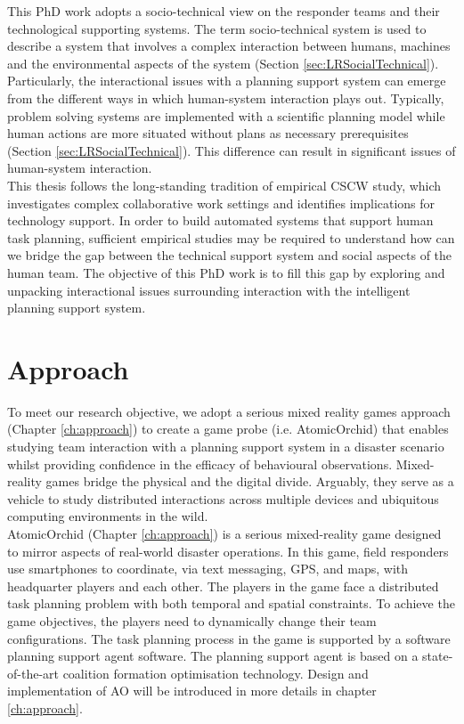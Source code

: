 This PhD work adopts a socio-technical view on the responder teams and their technological supporting systems. The term socio-technical system is used to describe a system that involves a complex interaction between humans, machines and the environmental aspects of the system (Section \ref{sec:LRSocialTechnical}). Particularly, the interactional issues with a planning support system can emerge from the different ways in which human-system interaction plays out. Typically, problem solving systems are implemented with a scientific planning model while human actions are more situated without plans as necessary prerequisites (Section \ref{sec:LRSocialTechnical}). This difference can result in significant issues of human-system interaction.\\

This thesis follows the long-standing tradition of empirical \ac{CSCW} study, which investigates complex collaborative work settings and identifies implications for technology support. In order to build automated systems that support human task planning, sufficient empirical studies may be required to understand how can we bridge the gap between the technical support system and social aspects of the human team.  The objective of this PhD work is to fill this gap by exploring and unpacking interactional issues surrounding interaction with the intelligent planning support system.\\

\section{Approach}\label{sec:custom}


To meet our research objective, we adopt a serious mixed reality games approach (Chapter \ref{ch:approach}) to create a game probe (i.e. AtomicOrchid) that enables studying team interaction with a planning support system in a disaster scenario whilst providing confidence in the efficacy of behavioural observations. Mixed-reality games bridge the physical and the digital divide. Arguably, they serve as a vehicle to study distributed interactions across multiple devices and ubiquitous computing environments in the wild.\\

AtomicOrchid (Chapter \ref{ch:approach}) is a serious mixed-reality game designed to mirror aspects of real-world disaster operations. In this game, field responders use smartphones to coordinate, via text messaging, GPS, and maps, with headquarter players and each other. The players in the game face a distributed task planning problem with both temporal and spatial constraints. To achieve the game objectives, the players need to dynamically change their team configurations. The task planning process in the game is supported by a software planning support agent software. The planning support agent is based on a state-of-the-art coalition formation optimisation technology. Design and implementation of \acf{AO} will be introduced in more details in chapter \ref{ch:approach}.\\

